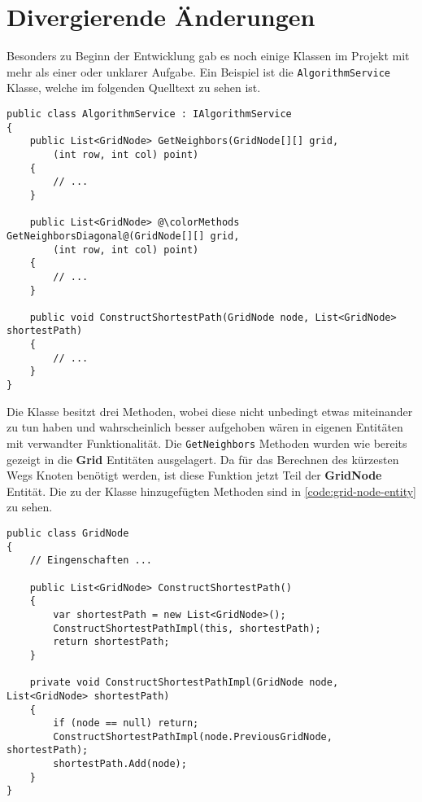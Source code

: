 \section{Divergierende Änderungen}
Besonders zu Beginn der Entwicklung gab es noch einige Klassen
im Projekt mit mehr als einer oder unklarer Aufgabe.
Ein Beispiel ist die \lstinline{AlgorithmService} Klasse,
welche im folgenden Quelltext zu sehen ist.
\begin{lstlisting}[caption={{\lstinline{AlgorithmService}} Klasse},
    label={code:alg-service}]
public class AlgorithmService : IAlgorithmService
{
    public List<GridNode> GetNeighbors(GridNode[][] grid,
        (int row, int col) point)
    {
        // ...
    }

    public List<GridNode> @\colorMethods GetNeighborsDiagonal@(GridNode[][] grid,
        (int row, int col) point)
    {
        // ...
    }

    public void ConstructShortestPath(GridNode node, List<GridNode> shortestPath)
    {
        // ...
    }
}
\end{lstlisting}
Die Klasse besitzt drei Methoden, wobei diese nicht unbedingt etwas miteinander
zu tun haben und wahrscheinlich besser aufgehoben
wären in eigenen Entitäten mit verwandter Funktionalität. Die \lstinline{GetNeighbors}
Methoden wurden wie bereits gezeigt in die \textbf{Grid} Entitäten ausgelagert.
Da für das Berechnen des kürzesten Wegs Knoten benötigt werden, ist diese
Funktion jetzt Teil der \textbf{GridNode} Entität. Die zu der Klasse
hinzugefügten Methoden sind in \autoref{code:grid-node-entity} zu sehen.
\begin{lstlisting}[caption={\lstinline{GridNode} Klasse}, label={code:grid-node-entity}]
public class GridNode
{
    // Eingenschaften ...

    public List<GridNode> ConstructShortestPath()
    {
        var shortestPath = new List<GridNode>();
        ConstructShortestPathImpl(this, shortestPath);
        return shortestPath;
    }

    private void ConstructShortestPathImpl(GridNode node, List<GridNode> shortestPath)
    {
        if (node == null) return;
        ConstructShortestPathImpl(node.PreviousGridNode, shortestPath);
        shortestPath.Add(node);
    }
}
\end{lstlisting}
